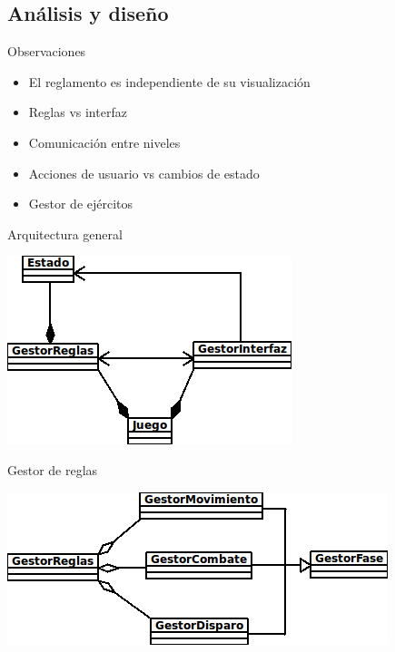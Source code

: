 \documentclass[green, compress]{beamer}
\begin{document}
\subsection{Análisis y diseño}
\begin{frame}
  \begin{block}{Observaciones}
    \begin{itemize}
    \item El reglamento es independiente de su visualización
    \item Reglas vs interfaz
    \item Comunicación entre niveles
    \item Acciones de usuario vs cambios de estado
    \item Gestor de ejércitos
    \end{itemize}
  \end{block}
\end{frame}

\begin{frame}{Arquitectura general}
\begin{center}
\includegraphics[scale=.9]{imagenes/DiagramaJuego.png}
\end{center}
\end{frame}

\begin{frame}{Gestor de reglas}
\begin{center}
\includegraphics[scale=.9]{imagenes/Reglas.png}
\end{center}
\end{frame}
\end{document}
